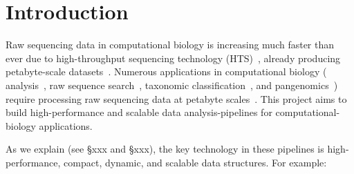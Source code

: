 

\section{Introduction}
\label{intro}





Raw sequencing data in computational biology is increasing much faster than ever
due to high-throughput sequencing technology (HTS)~\cite{cite-sequencing-technology}, already producing
petabyte-scale datasets~\cite{cite-petabyte-scale}. Numerous applications in computational biology (\kmer
analysis~\cite{cite-kmer-analysis}, raw sequence search~\cite{cite-raw-sequence}, taxonomic classification~\cite{cite-taxonomic-classification}, and pangenomics~\cite{cite-pangenomics})
require processing raw sequencing data at petabyte scales~\cite{cite-something-or-refer-to-figure-later-in-paper}. This project aims to
build high-performance and scalable data analysis-pipelines for computational-biology applications. 

As we explain (see \S{xxx} and \S{xxx}), the key technology in these pipelines is high-performance, compact, dynamic, and scalable data structures. For example: 

